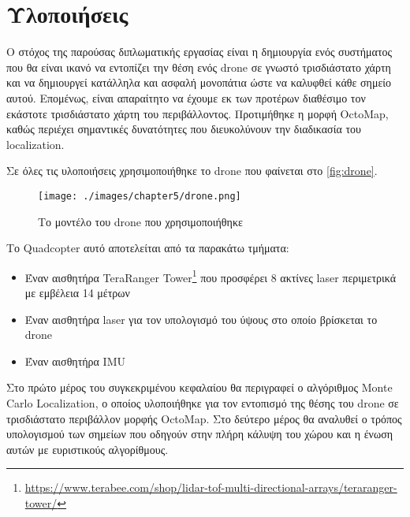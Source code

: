 \chapter{Υλοποιήσεις}
\label{chapter:implementations}

Ο στόχος της παρούσας διπλωματικής εργασίας είναι η δημιουργία ενός συστήματος που θα είναι ικανό να εντοπίζει την θέση ενός drone σε γνωστό τρισδιάστατο χάρτη και να δημιουργεί κατάλληλα και ασφαλή μονοπάτια ώστε να καλυφθεί κάθε σημείο αυτού. Επομένως, είναι απαραίτητο να έχουμε εκ των προτέρων διαθέσιμο τον εκάστοτε τρισδιάστατο χάρτη του περιβάλλοντος. Προτιμήθηκε η μορφή OctoMap, καθώς περιέχει σημαντικές δυνατότητες που διευκολύνουν την διαδικασία του localization.

Σε όλες τις υλοποιήσεις χρησιμοποιήθηκε το drone που φαίνεται στο \autoref{fig:drone}.

\begin{figure}[!ht]
    \centering
    \texttt{[image: ./images/chapter5/drone.png]}
    \caption{Το μοντέλο του drone που χρησιμοποιήθηκε} 
    \label{fig:drone}
\end{figure}

Το Quadcopter αυτό αποτελείται από τα παρακάτω τμήματα:
\begin{itemize}
        \item {Έναν αισθητήρα TeraRanger Tower\footnote{\href{https://www.terabee.com/shop/lidar-tof-multi-directional-arrays/teraranger-tower/}{https://www.terabee.com/shop/lidar-tof-multi-directional-arrays/teraranger-tower/}} που προσφέρει 8 ακτίνες laser περιμετρικά με εμβέλεια 14 μέτρων}
    \item{Έναν αισθητήρα laser για τον υπολογισμό του ύψους στο οποίο βρίσκεται το drone}
    \item{Έναν αισθητήρα IMU}
\end{itemize}

Στο πρώτο μέρος του συγκεκριμένου κεφαλαίου θα περιγραφεί ο αλγόριθμος Monte Carlo Localization, ο οποίος υλοποιήθηκε για τον εντοπισμό της θέσης του drone σε τρισδιάστατο περιβάλλον μορφής OctoMap. Στο δεύτερο μέρος θα αναλυθεί ο τρόπος υπολογισμού των σημείων που οδηγούν στην πλήρη κάλυψη του χώρου και η ένωση αυτών με ευριστικούς αλγορίθμους.





